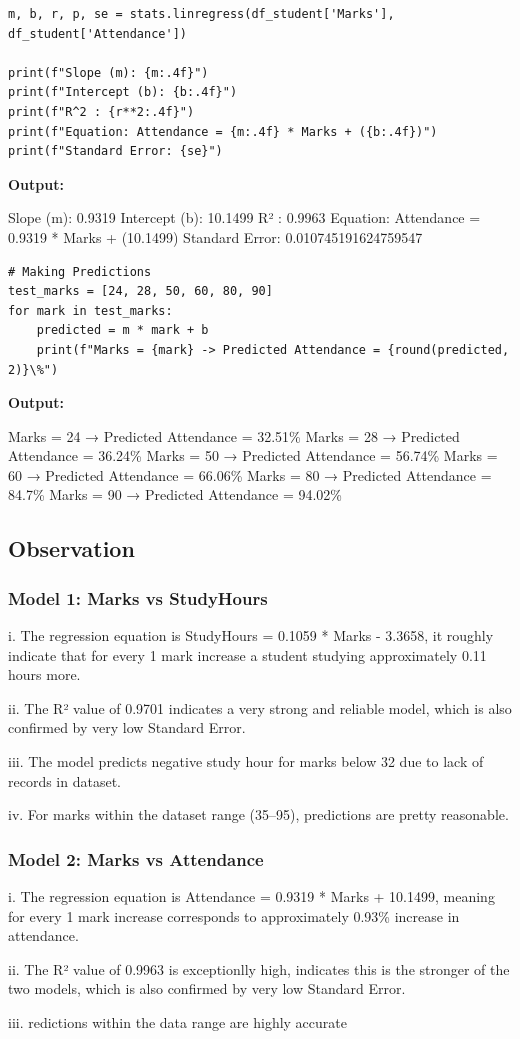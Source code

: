 \begin{lstlisting}[style=python]
m, b, r, p, se = stats.linregress(df_student['Marks'], df_student['Attendance'])

print(f"Slope (m): {m:.4f}")
print(f"Intercept (b): {b:.4f}")
print(f"R^2 : {r**2:.4f}")
print(f"Equation: Attendance = {m:.4f} * Marks + ({b:.4f})")
print(f"Standard Error: {se}")
\end{lstlisting}

\textbf{Output:}

Slope (m): 0.9319
Intercept (b): 10.1499
R² : 0.9963
Equation: Attendance = 0.9319 * Marks + (10.1499)
Standard Error: 0.010745191624759547

\gap

\begin{lstlisting}[style=python]
# Making Predictions
test_marks = [24, 28, 50, 60, 80, 90]
for mark in test_marks:
    predicted = m * mark + b
    print(f"Marks = {mark} -> Predicted Attendance = {round(predicted, 2)}\%")
\end{lstlisting}

\textbf{Output:}

Marks = 24 → Predicted Attendance = 32.51\%
Marks = 28 → Predicted Attendance = 36.24\%
Marks = 50 → Predicted Attendance = 56.74\%
Marks = 60 → Predicted Attendance = 66.06\%
Marks = 80 → Predicted Attendance = 84.7\%
Marks = 90 → Predicted Attendance = 94.02\%

\subsection{Observation}

\subsubsection*{Model 1: Marks vs StudyHours}

i. The regression equation is StudyHours = 0.1059 * Marks - 3.3658, it roughly indicate that for every 1 mark increase a student studying approximately 0.11 hours more.

ii. The R² value of 0.9701 indicates a very strong and reliable model, which is also confirmed by very low Standard Error.

iii. The model predicts negative study hour for marks below 32 due to lack of records in dataset.

iv. For marks within the dataset range (35--95), predictions are pretty reasonable.

\subsubsection*{Model 2: Marks vs Attendance}

i. The regression equation is Attendance = 0.9319 * Marks + 10.1499, meaning for every 1 mark increase corresponds to approximately 0.93\% increase in attendance.

ii. The R² value of 0.9963 is exceptionlly high, indicates this is the stronger of the two models, which is also confirmed by very low Standard Error.

iii. redictions within the data range are highly accurate

